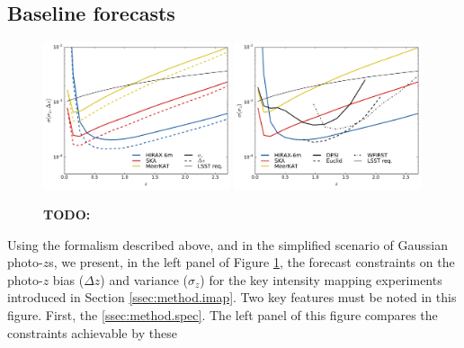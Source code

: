 \documentclass[prd,twocolumn]{revtex4}
\newcommand{\TODO}[1]{{\bf TODO:} \textcolor{red}{#1}}
\begin{document}
  \subsection{Baseline forecasts} \label{ssec:results.baseline}
    \begin{figure}
      \centering
      \includegraphics[width=0.49\textwidth]{compare_wbias}
      \includegraphics[width=0.49\textwidth]{compare_spec}
      \caption{\TODO{}}
      \label{fig:compare_spec}
    \end{figure}
    Using the formalism described above, and in the simplified scenario of Gaussian photo-$z$s,
    we present, in the left panel of Figure \ref{fig:compare_spec}, the forecast constraints on the 
    photo-$z$ bias ($\Delta z$) and variance ($\sigma_z$) for the key intensity mapping experiments
    introduced in Section \ref{ssec:method.imap}. Two key features must be noted in this figure.
    First, the 
    \ref{ssec:method.spec}. The left panel of this figure compares the constraints achievable by
    these 
    
    
    
\end{document}
